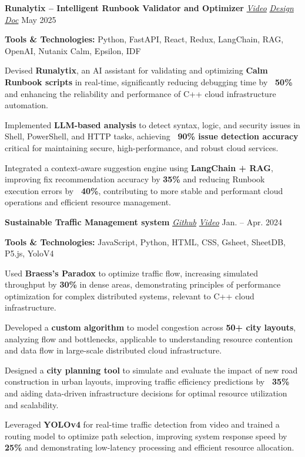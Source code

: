 \resumeSubHeadingListStart
    \resumeProject
      {{\textbf{Runalytix – Intelligent Runbook Validator and Optimizer}} \href{https://youtu.be/aLlhrwAPgxA}{\textit{\small{Video}}} \textbar{} \href{https://docs.google.com/presentation/d/1qt7XzuZkbnZ_yUeG8MJ2ZQZqVL7QH2_8/edit?slide=id.p1\#slide=id.p1}{\textit{\small{Design Doc}}}}
      {}
      {May 2025}
      {}
      \resumeItemListStart
        \item \textbf{Tools \& Technologies:} Python, FastAPI, React, Redux, LangChain, RAG, OpenAI, Nutanix Calm, Epsilon, IDF
        \item Devised \textbf{Runalytix}, an AI assistant for validating and optimizing \textbf{Calm Runbook scripts} in real-time, significantly reducing debugging time by \textbf{~50\%} and enhancing the reliability and performance of C++ cloud infrastructure automation.
        \item Implemented \textbf{LLM-based analysis} to detect syntax, logic, and security issues in Shell, PowerShell, and HTTP tasks, achieving \textbf{~90\% issue detection accuracy} critical for maintaining secure, high-performance, and robust cloud services.
        \item Integrated a context-aware suggestion engine using \textbf{LangChain + RAG}, improving fix recommendation accuracy by \textbf{35\%} and reducing Runbook execution errors by \textbf{~40\%}, contributing to more stable and performant cloud operations and efficient resource management.
      \resumeItemListEnd

    \resumeProject
      {{\textbf{Sustainable Traffic Management system}} \href{https://github.com/shubhamvermaa/Hack_36?tab=readme-ov-file}{\textit{\small{Github}}} \textbar{} \href{https://youtu.be/P73OS4Aaz14}{\textit{\small{Video}}}}
      {}
      {Jan. – Apr. 2024}
      {}
      \resumeItemListStart
        \item \textbf{Tools \& Technologies:} JavaScript, Python, HTML, CSS, Gsheet, SheetDB, P5.js, YoloV4
        \item Used \textbf{Braess's Paradox} to optimize traffic flow, increasing simulated throughput by \textbf{30\%} in dense areas, demonstrating principles of performance optimization for complex distributed systems, relevant to C++ cloud infrastructure.
        \item Developed a \textbf{custom algorithm} to model congestion across \textbf{50+ city layouts}, analyzing flow and bottlenecks, applicable to understanding resource contention and data flow in large-scale distributed cloud infrastructure.
        \item Designed a \textbf{city planning tool} to simulate and evaluate the impact of new road construction in urban layouts, improving traffic efficiency predictions by \textbf{~35\%} and aiding data-driven infrastructure decisions for optimal resource utilization and scalability.
        \item Leveraged \textbf{YOLOv4} for real-time traffic detection from video and trained a routing model to optimize path selection, improving system response speed by \textbf{25\%} and demonstrating low-latency processing and efficient resource allocation.
      \resumeItemListEnd


